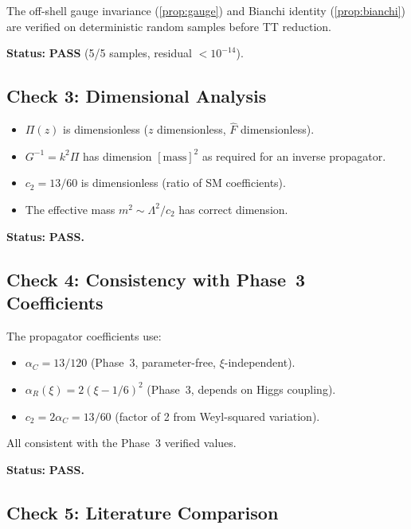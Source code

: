 \documentclass[11pt,a4paper]{article}
\theoremstyle{plain}
\theoremstyle{definition}
\begin{document}
The off-shell gauge invariance (\cref{prop:gauge}) and Bianchi identity
(\cref{prop:bianchi}) are verified on deterministic random samples
before TT reduction.

\noindent\textbf{Status:} \textcolor{green!50!black}{\textbf{PASS}}
(5/5 samples, residual $< 10^{-14}$).

\subsection{Check 3: Dimensional Analysis}

\begin{itemize}[nosep]
  \item $\Pi(z)$ is dimensionless ($z$ dimensionless, $\hat{F}$ dimensionless).
  \item $G^{-1} = k^2 \Pi$ has dimension $[\text{mass}]^2$ as required
    for an inverse propagator.
  \item $c_2 = 13/60$ is dimensionless (ratio of SM coefficients).
  \item The effective mass $m^2 \sim \Lambda^2/c_2$ has correct dimension.
\end{itemize}

\noindent\textbf{Status:} \textcolor{green!50!black}{\textbf{PASS.}}

\subsection{Check 4: Consistency with Phase~3 Coefficients}

The propagator coefficients use:
\begin{itemize}[nosep]
  \item $\alpha_C = 13/120$ (Phase~3, parameter-free, $\xi$-independent).
  \item $\alpha_R(\xi) = 2(\xi-1/6)^2$ (Phase~3, depends on Higgs coupling).
  \item $c_2 = 2\alpha_C = 13/60$ (factor of 2 from Weyl-squared variation).
\end{itemize}
All consistent with the Phase~3 verified values.

\noindent\textbf{Status:} \textcolor{green!50!black}{\textbf{PASS.}}

\subsection{Check 5: Literature Comparison}
\end{document}
